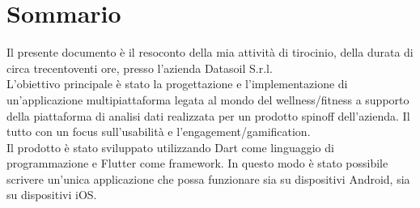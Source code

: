 
\cleardoublepage
{}
{}
\begingroup
\let\clearpage\relax
\let\cleardoublepage\relax
\let\cleardoublepage\relax

\chapter*{Sommario}

Il presente documento è il resoconto della mia attività di tirocinio, della durata di circa trecentoventi ore, presso l'azienda Datasoil S.r.l.\\
L'obiettivo principale è stato la progettazione e l'implementazione di un'applicazione multipiattaforma legata al mondo del wellness/fitness a supporto della piattaforma di analisi dati realizzata per un prodotto spinoff dell'azienda. Il tutto con un focus sull'usabilità e l'engagement/gamification.\\
Il prodotto è stato sviluppato utilizzando Dart come linguaggio di programmazione e Flutter come framework. In questo modo è stato possibile scrivere un'unica applicazione che possa funzionare sia su dispositivi Android, sia su dispositivi iOS.

%
%

\endgroup			

\vfill


